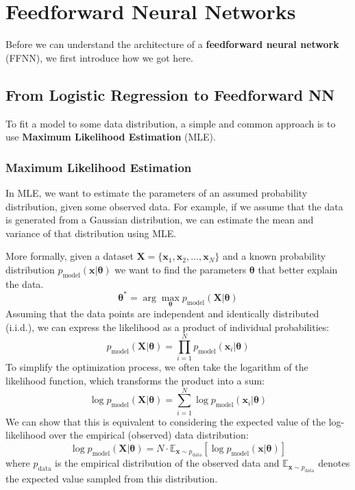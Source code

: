 \section{Feedforward Neural Networks}
Before we can understand the architecture of a \textbf{feedforward neural network} (FFNN), we first introduce
how we got here.

\subsection{From Logistic Regression to Feedforward NN}
To fit a model to some data distribution, a simple and common approach is to use \textbf{Maximum Likelihood Estimation} (MLE).
\subsubsection{Maximum Likelihood Estimation}
In MLE, we want to estimate the parameters of an assumed probability distribution, given some observed data. For example, if we assume that the data is generated from a Gaussian distribution, we can estimate the mean and variance of that distribution using MLE.

More formally, given a dataset $\boldsymbol{X} = \{\boldsymbol{x}_1, \boldsymbol{x}_2, \ldots, \boldsymbol{x}_N\}$ and a known probability distribution $p_{\text{model}}(\boldsymbol{x}|\boldsymbol{\theta})$
we want to find the parameters $\boldsymbol{\theta}$ that better explain the data.
\begin{equation}
    \label{MLE}
    \boldsymbol{\theta}^* = \arg\max_{\boldsymbol{\theta}} p_{\text{model}}(\boldsymbol{X}|\boldsymbol{\theta})
\end{equation}
Assuming that the data points are independent and identically distributed (i.i.d.), we can express the likelihood as a product of individual probabilities:
\begin{equation*}
    p_{\text{model}}(\boldsymbol{X}|\boldsymbol{\theta}) = \prod_{i=1}^{N} p_{\text{model}}(\boldsymbol{x}_i|\boldsymbol{\theta})
\end{equation*}
To simplify the optimization process, we often take the logarithm of the likelihood function, which transforms the product into a sum:
\begin{equation*}
    \log p_{\text{model}}(\boldsymbol{X}|\boldsymbol{\theta}) = \sum_{i=1}^{N} \log p_{\text{model}}(\boldsymbol{x}_i|\boldsymbol{\theta})
\end{equation*}
We can show that this is equivalent to considering the expected value of the log-likelihood over the empirical (observed) data distribution:
\begin{equation*}
    \log p_{\text{model}}(\boldsymbol{X}|\boldsymbol{\theta}) = N \cdot \mathbb{E}_{\boldsymbol{x} \sim p_{\text{data}}}[\log p_{\text{model}}(\boldsymbol{x}|\boldsymbol{\theta})]
\end{equation*}
where $p_{\text{data}}$ is the empirical distribution of the observed data and $\mathbb{E}_{\boldsymbol{x} \sim p_{\text{data}}}$ denotes the expected value sampled from this distribution.

